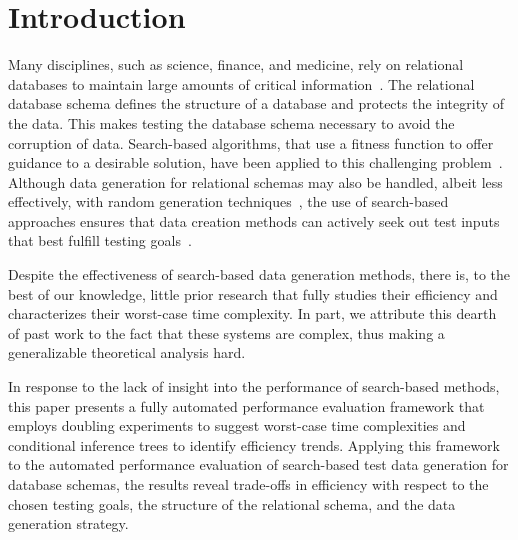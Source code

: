 
\vspace*{-.15in}
\section{Introduction}
\vspace*{-.05in}



Many disciplines, such as science, finance, and medicine, rely on relational databases to maintain large amounts of
critical information~\cite{kapfhammer2007}. The relational database schema defines the structure of a database and
protects the integrity of the data. This makes testing the database schema necessary to avoid the corruption of data.
Search-based algorithms, that use a fitness function to offer guidance to a desirable solution, have been applied to
this challenging problem~\cite{kapfhammer2013}. Although data generation for relational schemas may also be handled,
albeit less effectively, with random generation techniques~\cite{mcminn2015}, the use of search-based approaches ensures
that data creation methods can actively seek out test inputs that best fulfill testing goals~\cite{mcminn2004a}.



Despite the effectiveness of search-based data generation methods, there is, to the best of our knowledge, little prior
research that fully studies their efficiency and characterizes their worst-case time complexity. In part, we attribute
this dearth of past work to the fact that these systems are complex, thus making a generalizable theoretical analysis
hard.

In response to the lack of insight into the performance of search-based methods, this paper presents a fully automated
performance evaluation framework that employs doubling experiments to suggest worst-case time complexities and
conditional inference trees to identify efficiency trends. Applying this framework to the automated performance
evaluation of search-based test data generation for database schemas, the results reveal trade-offs in efficiency with
respect to the chosen testing goals, the structure of the relational schema, and the data generation strategy.

